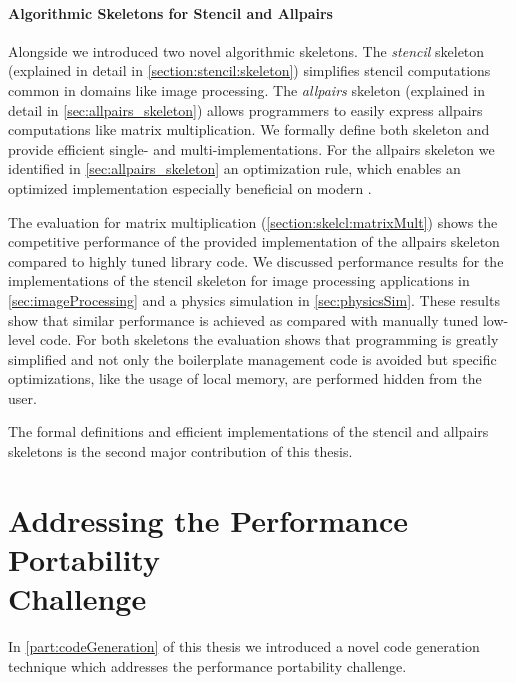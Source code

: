 \paragraph{Algorithmic Skeletons for Stencil and Allpairs}
Alongside \SkelCL we introduced two novel algorithmic skeletons.
The \emph{stencil} skeleton (explained in detail in \autoref{section:stencil:skeleton}) simplifies stencil computations common in domains like image processing.
The \emph{allpairs} skeleton (explained in detail in \autoref{sec:allpairs_skeleton}) allows programmers to easily express allpairs computations like matrix multiplication.
We formally define both skeleton and provide efficient single- and multi-\GPU implementations.
For the allpairs skeleton we identified in \autoref{sec:allpairs_skeleton} an optimization rule, which enables an optimized implementation especially beneficial on modern \GPUs.

The evaluation for matrix multiplication (\autoref{section:skelcl:matrixMult}) shows the competitive performance of the provided implementation of the allpairs skeleton compared to highly tuned library code.
We discussed performance results for the implementations of the stencil skeleton for image processing applications in \autoref{sec:imageProcessing} and a physics simulation in \autoref{sec:physicsSim}.
These results show that similar performance is achieved as compared with manually tuned low-level \OpenCL code.
For both skeletons the evaluation shows that programming is greatly simplified and not only the boilerplate management code is avoided but \GPU specific optimizations, like the usage of local memory, are performed hidden from the user.

\bigskip
The formal definitions and efficient \GPU implementations of the stencil and allpairs skeletons is the second major contribution of this thesis.


\section[Addressing the Performance Portability Challenge]{Addressing the Performance Portability\\ Challenge}
In \autoref{part:codeGeneration} of this thesis we introduced a novel code generation technique which addresses the performance portability challenge.

